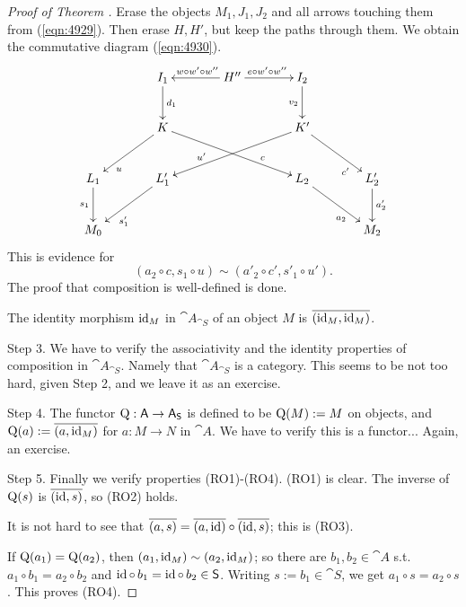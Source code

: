\begin{proof}[Proof of Theorem \tup{\ref{thm:103}}]
Erase the objects $M_1, J_1, J_2$ and all arrows touching them
from (\ref{eqn:4929}). 
Then erase $H, H'$, but keep the paths through them. 
We obtain the commutative diagram (\ref{eqn:4930}).
\begin{equation} \label{eqn:4930}
\UseTips  \xymatrix @C=8.5ex @R=6ex  {
&
I_1
\ar[d]^{d_1}
& 
H''
\ar[l]_{w \circ w' \circ w''}
\ar[r]^{e \circ w' \circ w''}
& 
I_2
\ar[d]_{v_2}
\\
&
K
\ar[dl]^(0.7){u}
\ar[drr]^(0.7){c}
& & 
K'
\ar[dll]_(0.7){u'}
\ar[dr]_(0.7){c'}
& 
\\
L_1
\ar[d]_{s_1}
&
L'_1
\ar[dl]^(0.65){s'_1}
& & 
L_2
\ar[dr]_(0.65){a_2}
& 
L'_2
\ar[d]^{a'_2}
\\
M_0 
& &
& &
M_2
}
\end{equation}
This is evidence for 
\[  (a_2 \circ c, s_1 \circ u) \sim (a'_2 \circ c', s'_1 \circ u') . \]
The proof that composition is well-defined is done.

The identity morphism $\operatorname{id}_M$ in $\cat{A}_{\cat{S}}$
of an object $M$ is $\overline{(\operatorname{id}_M, \operatorname{id}_M)}$.  

\medskip \noindent
Step 3. 
We have to verify the associativity and the identity properties of 
composition in $\cat{A}_{\cat{S}}$. Namely that $\cat{A}_{\cat{S}}$ is a
category. This seems to be not too hard, given Step
2, and we leave it as an exercise.

\medskip \noindent
Step 4.  
The functor $\operatorname{Q} : \operatorname{\mathsf{A}} \to \operatorname{\mathsf{A}}_{\operatorname{\mathsf{S}}}$ is defined to be 
$\operatorname{Q}(M) := M$ on objects, and $\operatorname{Q}(a) := \overline{(a, \operatorname{id}_M)}$ for 
$a : M \to N$ in $\cat{A}$. We have to verify this is a functor... Again, an 
exercise.

\medskip \noindent
Step 5.  
Finally we verify properties (RO1)-(RO4). (RO1) is clear. The inverse of
$\operatorname{Q}(s)$ is $\overline{(\operatorname{id}, s)}$, so (RO2) holds. 

It is not hard to see that 
$\overline{(a, s)} = \overline{(a, \operatorname{id})} \circ \overline{(\operatorname{id}, s)}$;
this is (RO3). 

If $\operatorname{Q}(a_1) = \operatorname{Q}(a_2)$, then 
$(a_1, \operatorname{id}_M) \sim (a_2, \operatorname{id}_M)$; so there
are $b_1, b_2 \in \cat{A}$  s.t.\ 
$a_1 \circ b_1 = a_2 \circ b_2$ and 
$\operatorname{id} \circ \, b_1 = \operatorname{id} \circ \, b_2 \in \operatorname{\mathsf{S}}$. 
Writing $s := b_1 \in \cat{S}$, we get $a_1 \circ s = a_2 \circ s$. This proves 
(RO4). 
\end{proof}


